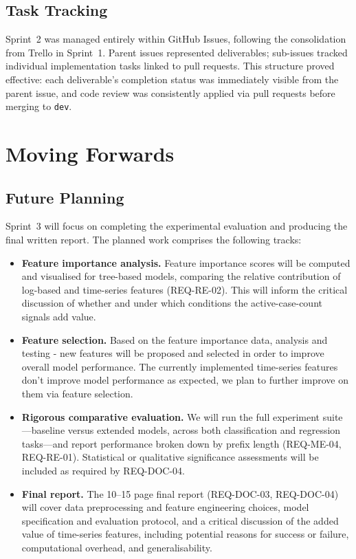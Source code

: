 \documentclass[runningheads]{llncs}
\begin{document}
\subsection{Task Tracking}

Sprint~2 was managed entirely within GitHub Issues, following the consolidation from Trello in Sprint~1. Parent issues represented deliverables; sub-issues tracked individual implementation tasks linked to pull requests. This structure proved effective: each deliverable's completion status was immediately visible from the parent issue, and code review was consistently applied via pull requests before merging to \texttt{dev}.


\section{Moving Forwards}

\subsection{Future Planning}

Sprint~3 will focus on completing the experimental evaluation and producing the final written report. The planned work comprises the following tracks:

\begin{itemize}
    \item \textbf{Feature importance analysis.} Feature importance scores will be computed and visualised for tree-based models, comparing the relative contribution of log-based and time-series features (REQ-RE-02). This will inform the critical discussion of whether and under which conditions the active-case-count signals add value.

    \item \textbf{Feature selection.} Based on the feature importance data, analysis and testing - new features will be proposed and selected in order to improve overall model performance. The currently implemented time-series features don't improve model performance as expected, we plan to further improve on them via feature selection.

    \item \textbf{Rigorous comparative evaluation.} We will run the full experiment suite---baseline versus extended models, across both classification and regression tasks---and report performance broken down by prefix length (REQ-ME-04, REQ-RE-01). Statistical or qualitative significance assessments will be included as required by REQ-DOC-04.

    \item \textbf{Final report.} The 10--15 page final report (REQ-DOC-03, REQ-DOC-04) will cover data preprocessing and feature engineering choices, model specification and evaluation protocol, and a critical discussion of the added value of time-series features, including potential reasons for success or failure, computational overhead, and generalisability.
\end{itemize}
\end{document}

